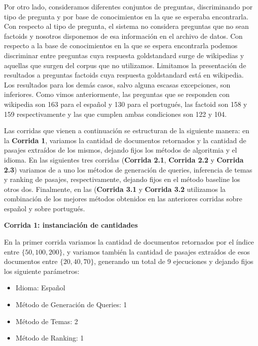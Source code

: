Por otro lado, consideramos diferentes conjuntos de preguntas, discriminando por tipo de pregunta y por base de conocimientos en la que se esperaba encontrarla. Con respecto al tipo de pregunta, el sistema no considera preguntas que no sean factoids y nosotros disponemos de esa información en el archivo de datos. Con respecto a la base de conocimientos en la que se espera encontrarla podemos discriminar entre preguntas cuya respuesta goldstandard surge de wikipedias y aquellas que surgen del corpus que no utilizamos. Limitamos la presentación de resultados a preguntas factoids cuya respuesta goldstandard está en wikipedia. Los resultados para los demás casos, salvo alguna escasas excepciones, son inferiores. Como vimos anteriormente, las preguntas que se responden con wikipedia son 163 para el español y 130 para el portugués, las factoid son 158 y 159 respectivamente y las que cumplen ambas condiciones son 122 y 104. \newline

Las corridas que vienen a continuación se estructuran de la siguiente manera: en la \textbf{Corrida 1}, variamos la cantidad de documentos retornados y la cantidad de pasajes extraídos de los mismos, dejando fijos los métodos de algoritmia y el idioma. En las siguientes tres corridas (\textbf{Corrida 2.1},  \textbf{Corrida 2.2} y \textbf{Corrida 2.3}) variamos de a uno los métodos de generación de queries, inferencia de temas y ranking de pasajes, respectivamente, dejando fijos en el método baseline los otros dos. Finalmente, en las (\textbf{Corrida 3.1} y \textbf{Corrida 3.2} utilizamos la combinación de los mejores métodos obtenidos en las anteriores corridas sobre español y sobre portugués. \newline

\textbf{Corrida 1: instanciación de cantidades} \newline

En la primer corrida variamos la cantidad de documentos retornados por el índice entre $\{50, 100, 200\}$, y variamos también la cantidad de pasajes extraídos de esos documentos entre $\{20, 40, 70\}$, generando un total de 9 ejecuciones y dejando fijos los siguiente parámetros: \newline

\begin{itemize}
  \item Idioma: Español
  \item Método de Generación de Queries: 1
  \item Método de Temas: 2
  \item Método de Ranking: 1
\end{itemize}

